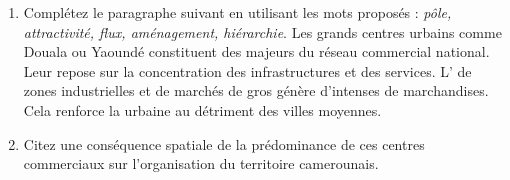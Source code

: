 \documentclass[11pt]{article}
\begin{document}
\begin{exercice}
\begin{enumerate}
    \item Complétez le paragraphe suivant en utilisant les mots proposés : \textit{pôle, attractivité, flux, aménagement, hiérarchie}.
    Les grands centres urbains comme Douala ou Yaoundé constituent des \underline{\hspace{2cm}} majeurs du réseau commercial national. Leur \underline{\hspace{2cm}} repose sur la concentration des infrastructures et des services. L'\underline{\hspace{2cm}} de zones industrielles et de marchés de gros génère d'intenses \underline{\hspace{2cm}} de marchandises. Cela renforce la \underline{\hspace{2cm}} urbaine au détriment des villes moyennes.
    \item Citez une conséquence spatiale de la prédominance de ces centres commerciaux sur l'organisation du territoire camerounais.
\end{enumerate}
\end{exercice}
\end{document}
